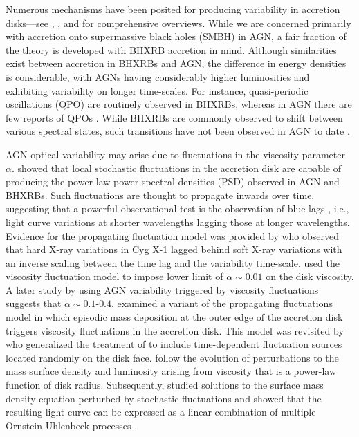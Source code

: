 \documentclass[a4paper,fleqn,usenatbib]{mnras}
\begin{document}
Numerous mechanisms have been posited for producing variability in accretion disks---see \citet{DoneAccretion}, \citet{MaccaroneAccretion}, and \citet{UttleyAccretion} for comprehensive overviews. While we are concerned primarily with accretion onto supermassive black holes (SMBH) in AGN, a fair fraction of the theory is developed with BHXRB accretion in mind. Although similarities exist between accretion in BHXRBs and AGN, the difference in energy densities is considerable, with AGNs having considerably higher luminosities and exhibiting variability on longer time-scales. For instance, quasi-periodic oscillations (QPO) are routinely observed in BHXRBs, whereas in AGN there are few reports of QPOs \citep{GierlinskiQPO,Andrae13,GrindleyQPO}. While BHXRBs are commonly observed to shift between various spectral states, such transitions have not been observed in AGN to date \citep{Kelly11}.

AGN optical variability may arise due to fluctuations in the \citet{ShakuraSunyaev73} viscosity parameter $\alpha$. \citet{Lyubarskii97} showed that local stochastic fluctuations in the accretion disk are capable of producing the power-law power spectral densities (PSD) observed in AGN and BHXRBs. Such fluctuations are thought to propagate inwards over time, suggesting that a powerful observational test is the observation of blue-lags \citep{UttleyAccretion}, i.e., light curve variations at shorter wavelengths lagging those at longer wavelengths. Evidence for the propagating fluctuation model was provided by \citet{Miyamoto88} who observed that hard X-ray variations in Cyg X-1 lagged behind soft X-ray variations with an inverse scaling between the time lag and the variability time-scale. \citet{Starling04} used the viscosity fluctuation model to impose lower limit of $\alpha \sim 0.01$ on the disk viscosity. A later study by \citet{King07} using AGN variability triggered by viscosity fluctuations suggests that $\alpha \sim 0.1$-$0.4$. \citet{Wood01} examined a variant of the \citet{Lyubarskii97} propagating fluctuations model in which episodic mass deposition at the outer edge of the accretion disk triggers viscosity fluctuations in the accretion disk. This model was revisited by \citet{Titarchuk07} who generalized the treatment of \citet{Wood01} to include time-dependent fluctuation sources located randomly on the disk face. \citet{Titarchuk07} follow the evolution of perturbations to the mass surface density and luminosity arising from viscosity that is a power-law function of disk radius. Subsequently, \citet{Kelly11} studied solutions to the surface mass density equation perturbed by stochastic fluctuations and showed that the resulting light curve can be expressed as a linear combination of multiple Ornstein-Uhlenbeck processes \citep{Gillespie96,Kelly09}.
\end{document}
